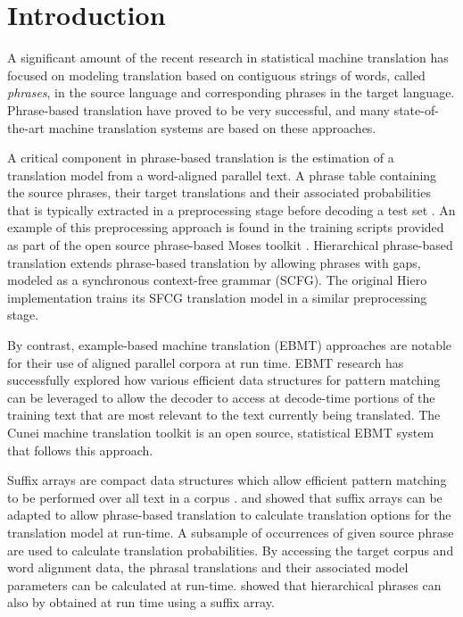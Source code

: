 \documentclass{pbml}
\newcommand{\newcite}{\namecite}
\begin{document}

\section{Introduction}

A significant amount of the recent research in statistical machine translation has focused on modeling translation based on contiguous strings of words, called {\it phrases}, in the source language and corresponding phrases in the target language. Phrase-based translation \cite{Och1999,Koehn2003,Marcu2002,Och2004} have proved to be very successful, and many state-of-the-art machine translation systems are based on these approaches.

A critical component in phrase-based translation is the estimation of a translation model from a word-aligned parallel text. A phrase table containing the source phrases, their target translations and their associated probabilities that  is typically extracted in a preprocessing stage before decoding a test set \cite{Koehn2003,Kumar2006}. An example of this preprocessing approach is found in the training scripts provided as part of the open source phrase-based Moses toolkit \cite{Moses}. Hierarchical phrase-based translation \cite{Chiang2005} extends phrase-based translation by allowing phrases with gaps, modeled as a synchronous context-free grammar (SCFG). The original Hiero implementation \cite{Chiang2007} trains its SFCG translation model in a similar preprocessing stage.

By contrast, example-based machine translation (EBMT) approaches \cite{Nagao1981,Sato1990,Somers2003} are notable for their use of aligned parallel corpora at run time. EBMT research has successfully explored how various efficient data structures for pattern matching \cite{Brown2004} can be leveraged to allow the decoder to access at decode-time portions of the training text that are most relevant to the text currently being translated. The Cunei machine translation toolkit \cite{Phillips2009} is an open source, statistical EBMT system that follows this approach.
 
Suffix arrays are compact data structures which allow efficient pattern matching to be performed over all text in a corpus \cite{Manber1990}.  \newcite{Callison-Burch2005b} and \newcite{Zhang2005} showed that suffix arrays can be adapted to allow phrase-based translation to calculate translation options for the translation model at run-time. A subsample of occurrences of given source phrase are used to calculate translation probabilities. By accessing the target corpus and word alignment data, the phrasal translations and their associated model parameters can be calculated at run-time. \newcite{Lopez2007} showed that hierarchical phrases can also by obtained at run time using a suffix array. 
\end{document}
